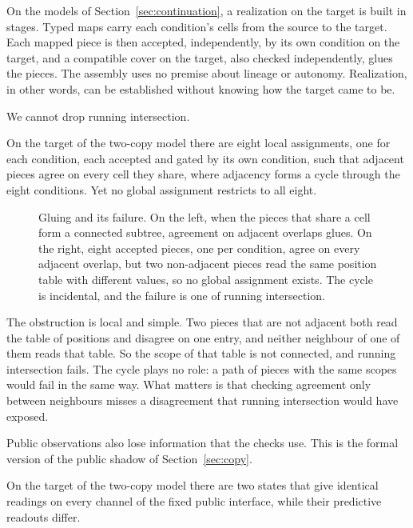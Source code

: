 On the models of Section~\ref{sec:continuation}, a realization on the target is
built in stages. Typed maps carry each condition's cells from the source to
the target. Each mapped piece is then accepted, independently, by its own
condition on the target, and a compatible cover on the target, also checked
independently, glues the pieces. The assembly uses no premise about lineage or autonomy. Realization,
in other words, can be established without knowing how the target came to be.

We cannot drop running intersection.

\begin{proposition}
\label{prop:cycle}
On the target of the two-copy model there are eight local assignments, one for
each condition, each accepted and gated by its own condition, such that
adjacent pieces agree on every cell they share, where adjacency forms a cycle
through the eight conditions. Yet no global assignment restricts to all eight.
\end{proposition}

\begin{figure}[tbp]
\centering

\caption{Gluing and its failure. On the left, when the pieces that share a cell form a connected subtree, agreement on adjacent overlaps glues. On the right, eight accepted pieces, one per condition, agree on every adjacent overlap, but two non-adjacent pieces read the same position table with different values, so no global assignment exists. The cycle is incidental, and the failure is one of running intersection.}
\label{fig:gluing}
\end{figure}

The obstruction is local and simple. Two pieces that are not adjacent both read
the table of positions and disagree on one entry, and neither neighbour of one
of them reads that table. So the scope of that table is not connected, and
running intersection fails. The cycle plays no role: a path of pieces with the
same scopes would fail in the same way. What matters is that checking
agreement only between neighbours misses a disagreement that running
intersection would have exposed.

Public observations also lose information that the checks use. This is the
formal version of the public shadow of Section~\ref{sec:copy}.

\begin{proposition}
\label{prop:shadow}
On the target of the two-copy model there are two states that give identical
readings on every channel of the fixed public interface, while their
predictive readouts differ.
\end{proposition}

